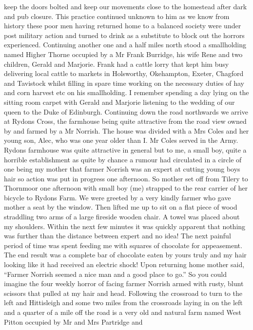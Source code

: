 keep the doors bolted and keep our movements close to the homestead after dark
and pub closure. This practice continued unknown to him as we know from history
these poor men having returned home to a balanced society were under post
military action and turned to drink as a substitute to block out the horrors
experienced. Continuing another one and a half miles north stood a smallholding
named Higher Thorne occupied by a Mr Frank Burridge, his wife Rene and two
children, Gerald and Marjorie. Frank had a cattle lorry that kept him busy
delivering local cattle to markets in Holsworthy, Okehampton, Exeter, Chagford
and Tavistock whilst filling in spare time working on the necessary duties of
hay and corn harvest etc on his smallholding. I remember spending a day lying
on the sitting room carpet with Gerald and Marjorie listening to the wedding of
our queen to the Duke of Edinburgh. Continuing down the road northwards we
arrive at Rydons Cross, the farmhouse being quite attractive from the road view
owned by and farmed by a Mr Norrish. The house was divided  with a Mrs Coles
and her young son, Alec, who was one year older than I. Mr Coles served in the
Army. Rydons farmhouse was quite attractive in general but to me, a small boy,
quite a horrible establishment as quite by chance a rumour had circulated in a
circle of one being my mother that farmer Norrish was an expert at cutting
young boys hair so action was put in progress one afternoon. So mother set off
from Tilery to Thornmoor one afternoon with small boy (me) strapped to the rear
carrier of her bicycle to Rydons Farm. We were greeted by a very kindly farmer
who gave mother a seat by the window. Then lifted me up to sit on a flat piece
of wood straddling two arms of a large fireside wooden chair. A towel was
placed about my shoulders. Within the next few minutes it was quickly apparent
that nothing was further than the distance between expert and no idea! The next
painful period of time was spent feeding me with squares of chocolate for
appeasement. The end result was a complete bar of chocolate eaten by yours
truly and my hair looking like it had received an electric shock!  Upon
returning home mother said, ``Farmer Norrish seemed a nice man and a good place
to go.''  So you could imagine the four weekly horror of facing farmer Norrish
armed with rusty, blunt scissors that pulled at my hair and head. Following the
crossroad to turn to the left and Hittisleigh and some two miles from the
crossroads laying in on the left and a quarter of a mile off the road is a very
old and natural farm named West Pitton occupied by Mr and Mrs Partridge and

